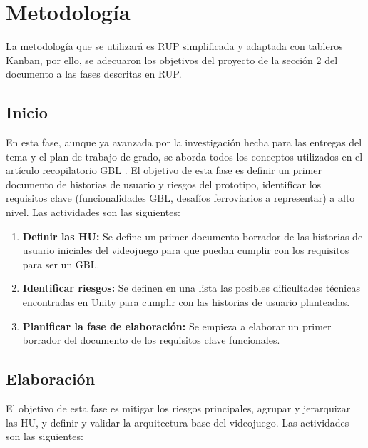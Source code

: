

\chapter{Metodología}

La metodología que se utilizará es RUP simplificada y adaptada con tableros Kanban, por ello, se adecuaron los objetivos del proyecto de la sección 2 del documento a las fases descritas en RUP.

\section{Inicio}

En esta fase, aunque ya avanzada por la investigación hecha para las entregas del tema y el plan de trabajo de grado, se aborda todos los conceptos utilizados en el artículo recopilatorio GBL \autocite{gblFrameworkExamining}. El objetivo de esta fase es definir un primer documento de historias de usuario y riesgos del prototipo, identificar los requisitos clave (funcionalidades GBL, desafíos ferroviarios a representar) a alto nivel. Las actividades son las siguientes:

\begin{enumerate}
  \item \textbf{Definir las HU:} Se define un primer documento borrador de las historias de usuario iniciales del videojuego para que puedan cumplir con los requisitos para ser un GBL.
  \item \textbf{Identificar riesgos:} Se definen en una lista las posibles dificultades técnicas encontradas en Unity para cumplir con las historias de usuario planteadas.
  \item \textbf{Planificar la fase de elaboración:} Se empieza a elaborar un primer borrador del documento de los requisitos clave funcionales.
\end{enumerate}

\section{Elaboración}

El objetivo de esta fase es mitigar los riesgos principales, agrupar y jerarquizar las HU, y definir y validar la arquitectura base del videojuego. Las actividades son las siguientes:

